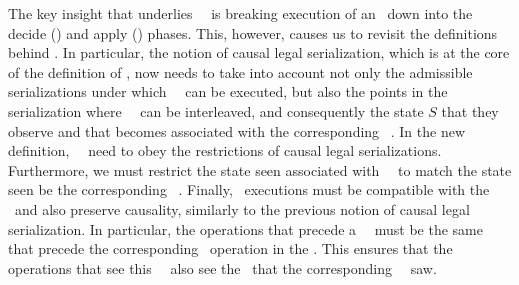 { The key insight that underlies \shadow\ \operations\ is breaking
  execution of an \operation\ down into the decide (\initial) and
  apply (\shadow) phases.  This, however, causes us to revisit the
  definitions behind \RBc. In particular, the notion of causal legal
  serialization, which is at the core of the definition of \RBc, now
  needs to take into account not only the admissible serializations
  under which \shadow\ \operations\ can be executed, but also the
  points in the serialization where \initial\ \operations\ can be
  interleaved, and consequently the state $S$ that they observe and
  that becomes associated with the corresponding \shadow\ \operation.
  In the new definition, \shadow\ \operations\ need to obey the
  restrictions of causal legal serializations.  Furthermore, we must
  restrict the state seen associated with \shadow\ \operations\ to
  match the state seen be the corresponding \initial\ \operation.
  Finally, \initial\ executions must be compatible with the \RBo\ and
  also preserve causality, similarly to the previous notion of causal
  legal serialization. In particular, the operations that precede a
  \initial\ \operation\ must be the same that precede the
  corresponding \shadow\ operation in the \RBo. This ensures that the
  operations that see this \shadow\ \operation\ also see the
  \operations\ that the corresponding \initial\ \operation\ saw.  }
\fi



